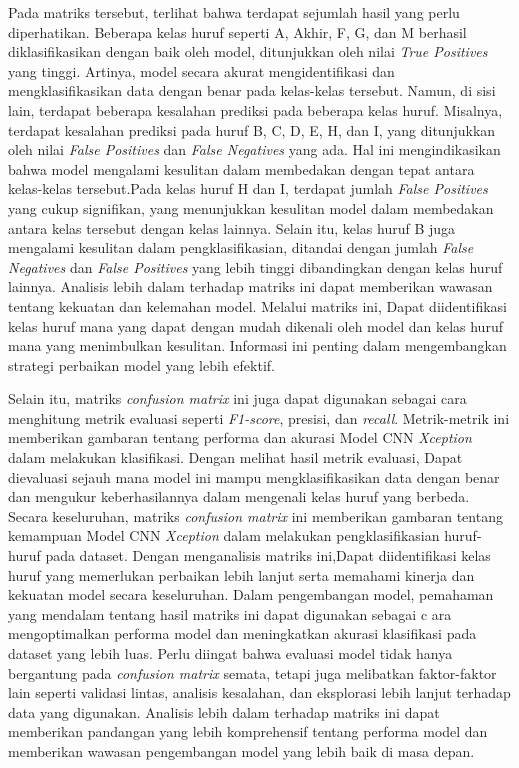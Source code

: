 Pada matriks tersebut, terlihat bahwa terdapat sejumlah hasil yang perlu diperhatikan. Beberapa kelas huruf seperti A, Akhir, F, G, dan M berhasil diklasifikasikan dengan baik oleh model, ditunjukkan oleh nilai \textit{True Positives} yang tinggi. Artinya, model secara akurat mengidentifikasi dan mengklasifikasikan data dengan benar pada kelas-kelas tersebut. Namun, di sisi lain, terdapat beberapa kesalahan prediksi pada beberapa kelas huruf. Misalnya, terdapat kesalahan prediksi pada huruf B, C, D, E, H, dan I, yang ditunjukkan oleh nilai \textit{False Positives} dan \textit{False Negatives} yang ada. Hal ini mengindikasikan bahwa model mengalami kesulitan dalam membedakan dengan tepat antara kelas-kelas tersebut.Pada kelas huruf H dan I, terdapat jumlah \textit{False Positives} yang cukup signifikan, yang menunjukkan kesulitan model dalam membedakan antara kelas tersebut dengan kelas lainnya. Selain itu, kelas huruf B juga mengalami kesulitan dalam pengklasifikasian, ditandai dengan jumlah \textit{False Negatives} dan \textit{False Positives} yang lebih tinggi dibandingkan dengan kelas huruf lainnya. Analisis lebih dalam terhadap matriks ini dapat memberikan wawasan tentang kekuatan dan kelemahan model. Melalui matriks ini, Dapat diidentifikasi kelas huruf mana yang dapat dengan mudah dikenali oleh model dan kelas huruf mana yang menimbulkan kesulitan. Informasi ini penting dalam mengembangkan strategi perbaikan model yang lebih efektif.

Selain itu, matriks \textit{confusion matrix} ini juga dapat digunakan sebagai cara menghitung metrik evaluasi seperti \textit{F1-score}, presisi, dan \textit{recall}. Metrik-metrik ini memberikan gambaran tentang performa dan akurasi Model CNN \textit{Xception} dalam melakukan klasifikasi. Dengan melihat hasil metrik evaluasi, Dapat dievaluasi sejauh mana model ini mampu mengklasifikasikan data dengan benar dan mengukur keberhasilannya dalam mengenali kelas huruf yang berbeda. Secara keseluruhan, matriks \textit{confusion matrix} ini memberikan gambaran tentang kemampuan Model CNN \textit{Xception} dalam melakukan pengklasifikasian huruf-huruf pada dataset. Dengan menganalisis matriks ini,Dapat diidentifikasi kelas huruf yang memerlukan perbaikan lebih lanjut serta memahami kinerja dan kekuatan model secara keseluruhan. Dalam pengembangan model, pemahaman yang mendalam tentang hasil matriks ini dapat digunakan sebagai c ara mengoptimalkan performa model dan meningkatkan akurasi klasifikasi pada dataset yang lebih luas. Perlu diingat bahwa evaluasi model tidak hanya bergantung pada \textit{confusion matrix} semata, tetapi juga melibatkan faktor-faktor lain seperti validasi lintas, analisis kesalahan, dan eksplorasi lebih lanjut terhadap data yang digunakan. Analisis lebih dalam terhadap matriks ini dapat memberikan pandangan yang lebih komprehensif tentang performa model dan memberikan wawasan pengembangan model yang lebih baik di masa depan.

